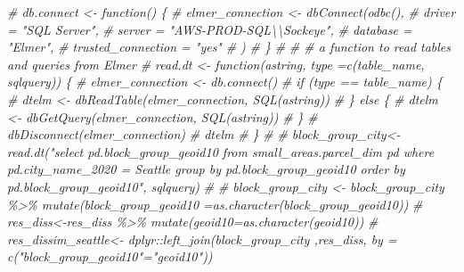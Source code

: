 \documentclass[
]{article}
\newenvironment{Shaded}{\begin{snugshade}}{\end{snugshade}}
\newcommand{\CommentTok}[1]{\textcolor[rgb]{0.56,0.35,0.01}{\textit{#1}}}
\begin{document}
\begin{Shaded}
\begin{Highlighting}[]
\CommentTok{\# db.connect \textless{}{-} function() \{}
\CommentTok{\#   elmer\_connection \textless{}{-} dbConnect(odbc(),}
\CommentTok{\#                                 driver = "SQL Server",}
\CommentTok{\#                                 server = "AWS{-}PROD{-}SQL\textbackslash{}\textbackslash{}Sockeye",}
\CommentTok{\#                                 database = "Elmer",}
\CommentTok{\#                                 trusted\_connection = "yes"}
\CommentTok{\#   )}
\CommentTok{\# \}}
\CommentTok{\# }
\CommentTok{\# \# a function to read tables and queries from Elmer}
\CommentTok{\# read.dt \textless{}{-} function(astring, type =c(\textquotesingle{}table\_name\textquotesingle{}, \textquotesingle{}sqlquery\textquotesingle{})) \{}
\CommentTok{\#   elmer\_connection \textless{}{-} db.connect()}
\CommentTok{\#   if (type == \textquotesingle{}table\_name\textquotesingle{}) \{}
\CommentTok{\#     dtelm \textless{}{-} dbReadTable(elmer\_connection, SQL(astring))}
\CommentTok{\#   \} else \{}
\CommentTok{\#     dtelm \textless{}{-} dbGetQuery(elmer\_connection, SQL(astring))}
\CommentTok{\#   \}}
\CommentTok{\#   dbDisconnect(elmer\_connection)}
\CommentTok{\#   dtelm}
\CommentTok{\# \}}
\CommentTok{\# }
\CommentTok{\# block\_group\_city\textless{}{-}read.dt("select pd.block\_group\_geoid10 from small\_areas.parcel\_dim pd where pd.city\_name\_2020 = \textquotesingle{}Seattle\textquotesingle{} group by pd.block\_group\_geoid10 order by pd.block\_group\_geoid10", \textquotesingle{}sqlquery\textquotesingle{})}
\CommentTok{\# }
\CommentTok{\# block\_group\_city \textless{}{-} block\_group\_city \%\textgreater{}\% mutate(block\_group\_geoid10 =as.character(block\_group\_geoid10))}
\CommentTok{\# res\_diss\textless{}{-}res\_diss \%\textgreater{}\% mutate(geoid10=as.character(geoid10))}
\CommentTok{\# res\_dissim\_seattle\textless{}{-} dplyr::left\_join(block\_group\_city ,res\_diss, by = c("block\_group\_geoid10"="geoid10"))}
\end{Highlighting}
\end{Shaded}
\end{document}
